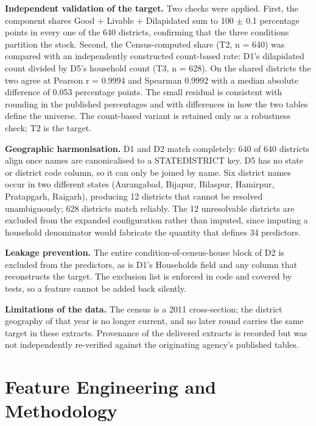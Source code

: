 \documentclass[conference]{IEEEtran}
\begin{document}
\textbf{Independent validation of the target.} Two checks were applied. First, the component shares Good + Livable + Dilapidated sum to 100 $\pm$ 0.1 percentage points in every one of the 640 districts, confirming that the three conditions partition the stock. Second, the Census-computed share (T2, n = 640) was compared with an independently constructed count-based rate: D1's dilapidated count divided by D5's household count (T3, n = 628). On the shared districts the two agree at Pearson r = 0.9994 and Spearman 0.9992 with a median absolute difference of 0.053 percentage points. The small residual is consistent with rounding in the published percentages and with differences in how the two tables define the universe. The count-based variant is retained only as a robustness check; T2 is the target.

\textbf{Geographic harmonisation.} D1 and D2 match completely: 640 of 640 districts align once names are canonicalised to a STATE\textbar\textbar{}DISTRICT key. D5 has no state or district code column, so it can only be joined by name. Six district names occur in two different states (Aurangabad, Bijapur, Bilaspur, Hamirpur, Pratapgarh, Raigarh), producing 12 districts that cannot be resolved unambiguously; 628 districts match reliably. The 12 unresolvable districts are excluded from the expanded configuration rather than imputed, since imputing a household denominator would fabricate the quantity that defines 34 predictors.

\textbf{Leakage prevention.} The entire condition-of-census-house block of D2 is excluded from the predictors, as is D1's Households field and any column that reconstructs the target. The exclusion list is enforced in code and covered by tests, so a feature cannot be added back silently.

\textbf{Limitations of the data.} The census is a 2011 cross-section; the district geography of that year is no longer current, and no later round carries the same target in these extracts. Provenance of the delivered extracts is recorded but was not independently re-verified against the originating agency's published tables.

\section{Feature Engineering and Methodology}
\end{document}
